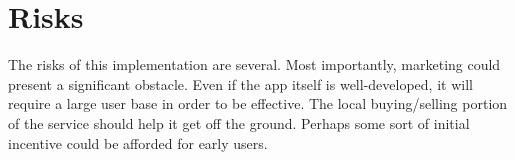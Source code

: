 \documentclass[12pt]{article}
\begin{document}
	\section{Risks}
	The risks of this implementation are several. Most importantly, marketing could present a significant obstacle.
        Even if the app itself is well-developed, it will require a large user base in order to be effective. The local
	buying/selling portion of the service should help it get off the ground.	
	Perhaps some
	sort of initial incentive could be afforded for early users. 
\end{document}
